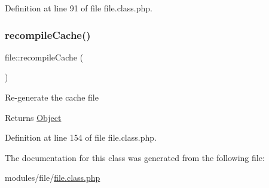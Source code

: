 Definition at line 91 of file file.\+class.\+php.

\hypertarget{classfile_abdd4624fd45f101cdf4009eeda3cc1ab}{}\label{classfile_abdd4624fd45f101cdf4009eeda3cc1ab} 
\subsubsection{\texorpdfstring{recompile\+Cache()}{recompileCache()}}
{\footnotesize\ttfamily file\+::recompile\+Cache (\begin{DoxyParamCaption}{ }\end{DoxyParamCaption})}

Re-\/generate the cache file

\begin{DoxyReturn}{Returns}
\hyperlink{classObject}{Object} 
\end{DoxyReturn}


Definition at line 154 of file file.\+class.\+php.



The documentation for this class was generated from the following file\+:\begin{DoxyCompactItemize}
\item 
modules/file/\hyperlink{file_8class_8php}{file.\+class.\+php}\end{DoxyCompactItemize}
